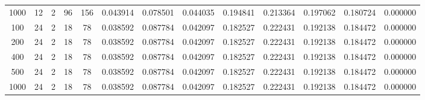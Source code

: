\begin{table}[h]
\begin{tabular}{ccccccccccccc}
1000 & 12 & 2 & 96 & 156 & 0.043914 & 0.078501 & 0.044035 & 0.194841 & 0.213364 & 0.197062 & 0.180724 & 0.000000 \\
100 & 24 & 2 & 18 & 78 & 0.038592 & 0.087784 & 0.042097 & 0.182527 & 0.222431 & 0.192138 & 0.184472 & 0.000000 \\
200 & 24 & 2 & 18 & 78 & 0.038592 & 0.087784 & 0.042097 & 0.182527 & 0.222431 & 0.192138 & 0.184472 & 0.000000 \\
400 & 24 & 2 & 18 & 78 & 0.038592 & 0.087784 & 0.042097 & 0.182527 & 0.222431 & 0.192138 & 0.184472 & 0.000000 \\
500 & 24 & 2 & 18 & 78 & 0.038592 & 0.087784 & 0.042097 & 0.182527 & 0.222431 & 0.192138 & 0.184472 & 0.000000 \\
1000 & 24 & 2 & 18 & 78 & 0.038592 & 0.087784 & 0.042097 & 0.182527 & 0.222431 & 0.192138 & 0.184472 & 0.000000 \\
\bottomrule
\end{tabular}
\end{table}
